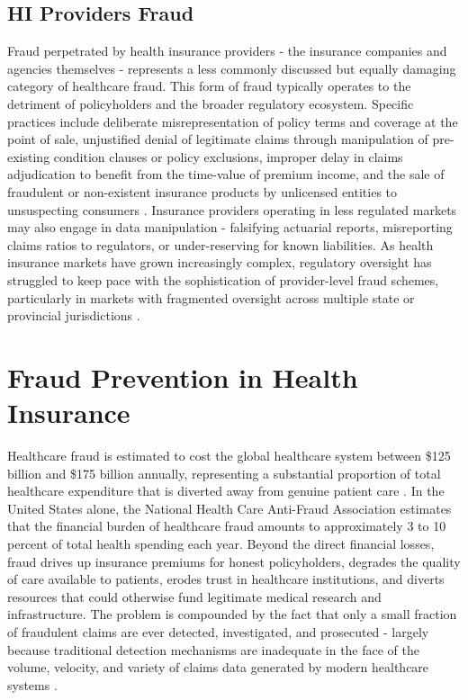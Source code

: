 \subsection{HI Providers Fraud}

Fraud perpetrated by health insurance providers - the insurance companies and agencies themselves - represents a less commonly discussed but equally damaging category of healthcare fraud. This form of fraud typically operates to the detriment of policyholders and the broader regulatory ecosystem. Specific practices include deliberate misrepresentation of policy terms and coverage at the point of sale, unjustified denial of legitimate claims through manipulation of pre-existing condition clauses or policy exclusions, improper delay in claims adjudication to benefit from the time-value of premium income, and the sale of fraudulent or non-existent insurance products by unlicensed entities to unsuspecting consumers \cite{zhu2021}. Insurance providers operating in less regulated markets may also engage in data manipulation - falsifying actuarial reports, misreporting claims ratios to regulators, or under-reserving for known liabilities. As health insurance markets have grown increasingly complex, regulatory oversight has struggled to keep pace with the sophistication of provider-level fraud schemes, particularly in markets with fragmented oversight across multiple state or provincial jurisdictions \cite{sun2018patient}.

\section{Fraud Prevention in Health Insurance}

Healthcare fraud is estimated to cost the global healthcare system between \$125 billion and \$175 billion annually, representing a substantial proportion of total healthcare expenditure that is diverted away from genuine patient care \cite{healthinsurance2021,macfarlane2020}. In the United States alone, the National Health Care Anti-Fraud Association estimates that the financial burden of healthcare fraud amounts to approximately 3 to 10 percent of total health spending each year. Beyond the direct financial losses, fraud drives up insurance premiums for honest policyholders, degrades the quality of care available to patients, erodes trust in healthcare institutions, and diverts resources that could otherwise fund legitimate medical research and infrastructure. The problem is compounded by the fact that only a small fraction of fraudulent claims are ever detected, investigated, and prosecuted - largely because traditional detection mechanisms are inadequate in the face of the volume, velocity, and variety of claims data generated by modern healthcare systems \cite{zhou2020}.

